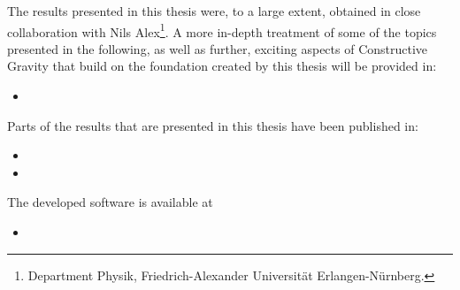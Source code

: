 The results presented in this thesis were, to a large extent, obtained in close collaboration with Nils Alex\footnote{Department Physik, Friedrich-Alexander Universität Erlangen-Nürnberg.}. 
A more in-depth treatment of some of the topics presented in the following, as well as further, exciting aspects of Constructive Gravity that build on the foundation created by this thesis will be provided in:
\begin{itemize}
    \item {}
\end{itemize}
Parts of the results that are presented in this thesis have been published in:
\begin{itemize}
    \item {}
    \item {}
\end{itemize}
The developed software is available at
\begin{itemize}
    \item {}
\end{itemize}